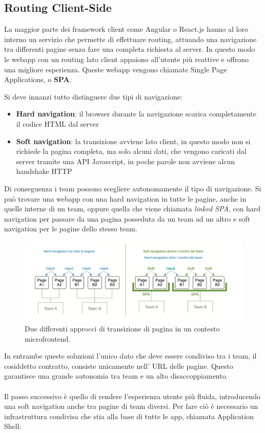 \pagebreak
\subsection{Routing Client-Side }
La maggior parte dei framework client come Angular o React.js hanno al loro interno un servizio che permette di
effettuare routing, attuando una navigazione tra differenti pagine senza fare una completa richiesta al server.
In questo modo le webapp con un routing lato client appaiono all'utente più reattive e offrono una migliore esperienza.
Queste webapp vengono chiamate Single Page Applications, o \textbf{SPA}.

Si deve innanzi tutto distinguere due tipi di navigazione:
\begin{itemize}
    \item \textbf{Hard navigation}: il browser durante la navigazione scarica completamente il codice HTML dal server
    \item \textbf{Soft navigation}: la transizione avviene lato client, in questo modo non si richiede la pagina completa,
     ma solo alcuni dati, che vengono caricati dal server tramite una API Javascript, in poche parole non avviene alcun handshake HTTP
\end{itemize}

Di conseguenza i team possono scegliere autonomamente il tipo di navigazione.
Si può trovare una webapp con una hard navigation in tutte le pagine, anche in quelle interne di un team,
oppure quella che viene chiamata \emph{linked SPA}, con hard navigation per passare da una pagina posseduta da un team ad un altro
e soft navigation per le pagine dello stesso team.
\begin{figure}[H]
    \centering
    \includegraphics[width=148mm]{img/navigazione}
    \caption{Due differenti approcci di transizione di pagina in un contesto microfrontend.}
  \end{figure}

In entrambe queste soluzioni l'unico dato che deve essere condiviso tra i team, il cosiddetto contratto, consiste 
unicamente nell' URL delle pagine. Questo garantisce una grande autonomia tra team e un alto disaccoppiamento.
\\\\
Il passo successivo è quello di rendere l'esperienza utente più fluida, introducendo una soft navigation anche tra pagine di team 
diversi. Per fare ciò è necessario un infrastruttura condivisa che stia alla base di tutte le app, chiamata Application Shell:


